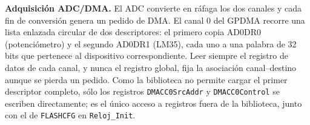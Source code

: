 \textbf{Adquisición ADC/DMA.} El ADC convierte en ráfaga los dos canales y cada fin de
conversión genera un pedido de DMA. El canal 0 del GPDMA recorre una lista enlazada
circular de dos descriptores: el primero copia AD0DR0 (potenciómetro) y el segundo AD0DR1
(LM35), cada uno a una palabra de 32 bits que pertenece al dispositivo correspondiente.
Leer siempre el registro de datos de cada canal, y nunca el registro global, fija la
asociación canal--destino aunque se pierda un pedido. Como la biblioteca no permite
cargar el primer descriptor completo, sólo los registros \texttt{DMACC0SrcAddr} y
\texttt{DMACC0Control} se escriben directamente; es el único acceso a registros fuera de
la biblioteca, junto con el de \texttt{FLASHCFG} en \texttt{Reloj\_Init}.
